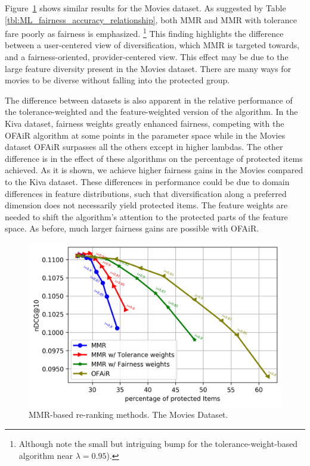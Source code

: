 Figure~\ref{fig:ML_mmr_based_methods} shows similar results for the Movies dataset. As suggested by Table \ref{tbl:ML_fairness_accuracy_relationship}, both MMR and MMR with tolerance fare poorly as fairness is emphasized. \footnote{Although note the small but intriguing bump for the tolerance-weight-based algorithm near $\lambda = 0.95$).}
This finding highlights the difference between a user-centered view of diversification, which MMR is targeted towards, and a fairness-oriented, provider-centered view. This effect may be due to the large feature diversity present in the Movies dataset. There are many ways for movies to be diverse without falling into the protected group. 

The difference between datasets is also apparent in the relative performance of the tolerance-weighted and the feature-weighted version of the algorithm. In the Kiva dataset, fairness weights greatly enhanced fairness, competing with the OFAiR algorithm at some points in the parameter space while in the Movies dataset OFAiR surpasses all the others except in higher lambdas. The other difference is in the effect of these algorithms on the percentage of protected items achieved. As it is shown, we achieve higher fairness gains in the Movies compared to the Kiva dataset.
These differences in performance could be due to domain differences in feature distributions, such that diversification along a preferred dimension does not necessarily yield protected items. The feature weights are needed to shift the algorithm's attention to the protected parts of the feature space. As before, much larger fairness gains are possible with OFAiR.

\begin{figure}[tbh]
    \centering
    \includegraphics[width=\linewidth]{imgs/ofair/ml_ndcg_itemCov_CountryGenre_cut.png}
    \caption{MMR-based re-ranking methods. The Movies Dataset.}
    \label{fig:ML_mmr_based_methods}
\end{figure}

